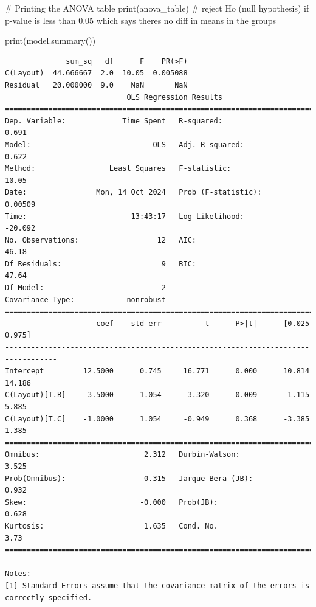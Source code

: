 \documentclass[
  letterpaper,
  DIV=11,
  numbers=noendperiod]{scrartcl}
\newenvironment{Shaded}{\begin{snugshade}}{\end{snugshade}}
\newcommand{\BuiltInTok}[1]{\textcolor[rgb]{0.00,0.23,0.31}{#1}}
\newcommand{\CommentTok}[1]{\textcolor[rgb]{0.37,0.37,0.37}{#1}}
\newcommand{\NormalTok}[1]{\textcolor[rgb]{0.00,0.23,0.31}{#1}}
\begin{document}
\begin{Shaded}
\begin{Highlighting}[]
\CommentTok{\# Printing the ANOVA table}
\BuiltInTok{print}\NormalTok{(anova\_table)   }\CommentTok{\# reject Ho (null hypothesis) if p{-}value is less than 0.05 which says there\textquotesingle{}s no diff in means in the groups}

\BuiltInTok{print}\NormalTok{(model.summary())}
\end{Highlighting}
\end{Shaded}

\begin{verbatim}
              sum_sq   df      F    PR(>F)
C(Layout)  44.666667  2.0  10.05  0.005088
Residual   20.000000  9.0    NaN       NaN
                            OLS Regression Results                            
==============================================================================
Dep. Variable:             Time_Spent   R-squared:                       0.691
Model:                            OLS   Adj. R-squared:                  0.622
Method:                 Least Squares   F-statistic:                     10.05
Date:                Mon, 14 Oct 2024   Prob (F-statistic):            0.00509
Time:                        13:43:17   Log-Likelihood:                -20.092
No. Observations:                  12   AIC:                             46.18
Df Residuals:                       9   BIC:                             47.64
Df Model:                           2                                         
Covariance Type:            nonrobust                                         
==================================================================================
                     coef    std err          t      P>|t|      [0.025      0.975]
----------------------------------------------------------------------------------
Intercept         12.5000      0.745     16.771      0.000      10.814      14.186
C(Layout)[T.B]     3.5000      1.054      3.320      0.009       1.115       5.885
C(Layout)[T.C]    -1.0000      1.054     -0.949      0.368      -3.385       1.385
==============================================================================
Omnibus:                        2.312   Durbin-Watson:                   3.525
Prob(Omnibus):                  0.315   Jarque-Bera (JB):                0.932
Skew:                          -0.000   Prob(JB):                        0.628
Kurtosis:                       1.635   Cond. No.                         3.73
==============================================================================

Notes:
[1] Standard Errors assume that the covariance matrix of the errors is correctly specified.
\end{verbatim}
\end{document}
